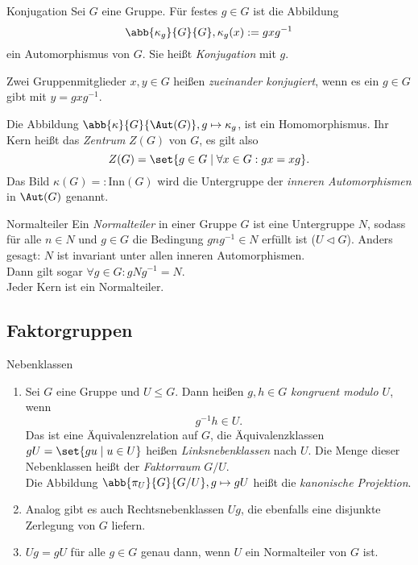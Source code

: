 \begin{karte}{Konjugation}
    Sei \(G\) eine Gruppe. Für festes \(g\in G\) ist die Abbildung 
    \[ \abb{\kappa_g}{G}{G}, \kappa_g(x) := g x g^{-1} \]
    ein Automorphismus von \(G\). Sie heißt \textit{Konjugation} mit \(g\).
    
    Zwei Gruppenmitglieder \(x,y\in G\) heißen \textit{zueinander konjugiert}, 
    wenn es ein \(g\in G\) gibt mit \(y=g x g^{-1}\).

    Die Abbildung \(\abb{\kappa}{G}{\Aut(G)}, g\mapsto \kappa_g\), 
    ist ein Homomorphismus. Ihr Kern heißt das \textit{Zentrum} 
    \(Z(G)\) von \(G\), es gilt also 
    \[ Z(G) = \set{g\in G \;|\; \forall x\in G: gx=xg}. \]
    Das Bild \(\kappa(G) =: \mathrm{Inn}(G)\) wird die Untergruppe 
    der \textit{inneren Automorphismen} in \(\Aut(G)\) genannt.
\end{karte}

\begin{karte}{Normalteiler}
    Ein \textit{Normalteiler} in einer Gruppe \(G\) ist 
    eine Untergruppe \(N\), sodass für alle \(n\in N\) und 
    \(g\in G\) die Bedingung \(g n g^{-1} \in N\) erfüllt ist (\(U \lhd G\)). 
    Anders gesagt: \(N\) ist invariant unter allen inneren Automorphismen.\\
    Dann gilt sogar \(\forall g\in G: g N g^{-1} = N\).\\
    Jeder Kern ist ein Normalteiler.
\end{karte}

\subsection{Faktorgruppen}

\begin{karte}{Nebenklassen}
    \begin{enumerate}
        \item Sei \(G\) eine Gruppe und \(U\leq G\). Dann heißen 
        \(g,h\in G\) \textit{kongruent modulo \(U\)}, wenn 
        \[ g^{-1}h\in U. \]
        Das ist eine Äquivalenzrelation auf \(G\), die Äquivalenzklassen 
        \(gU = \set{gu \;|\; u\in U}\) heißen \textit{Linksnebenklassen} 
        nach \(U\). 
        Die Menge dieser Nebenklassen heißt der \textit{Faktorraum} \(G/U\).\\
        Die Abbildung \( \abb{\pi_U}{G}{G/U}, g\mapsto gU \) heißt 
        die \textit{kanonische Projektion}.
        \item Analog gibt es auch Rechtsnebenklassen \(Ug\), 
        die ebenfalls eine disjunkte Zerlegung von \(G\) liefern.
        \item \(Ug = gU\) für alle \(g\in G\) genau dann, wenn 
        \(U\) ein Normalteiler von \(G\) ist.
    \end{enumerate}
\end{karte}

